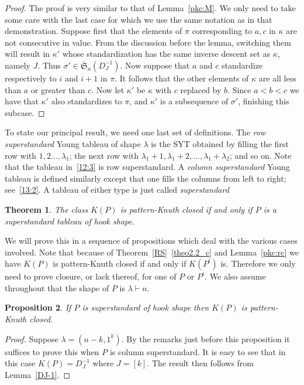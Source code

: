 \documentclass[10pt]{amsart}
\newtheorem{theo}{Theorem}[section]
\newtheorem{prop}[theo]{Proposition}
\newcommand{\ofS}{\ol{\fS}}
\newcommand{\ol}{\overline}
\newcommand{\ptn}{\vdash}
\newcommand{\ree}[1]{\eqref{#1}}
\newcommand{\ka}{\kappa}
\newcommand{\la}{\lambda}
\newcommand{\si}{\sigma}
\newcommand{\fS}{{\mathfrak S}}
\begin{document}
\begin{proof}
The proof is very similar to that of Lemma~\ref{pkc:M}. We only need to take some care with the last case for which we use the same notation as in that demonstration. Suppose first that the elements of $\pi$ corresponding to $a,c$ in $\ka$ are not consecutive in value. From the discussion before the lemma, switching them will result in $\ka'$ whose standardization has the same inverse descent set as $\ka$, namely $J$. Thus $\si'\in\ofS_n(D_J^{-1})$. Now suppose that $a$ and $c$ standardize respectively to $i$ and $i+1$ in $\pi$. It follows that the other elements of $\ka$ are all less than $a$ or greater than $c$. Now let $\ka'$ be $\ka$ with $c$ replaced by $b$. Since $a<b<c$ we have that $\ka'$ also standardizes to $\pi$, and $\ka'$ is a subsequence of $\si'$, finishing this subcase.
\end{proof}

To state our principal result, we need one last set of definitions. The \emph{row superstandard} Young tableau of shape $\la$ is the SYT obtained by filling the first row with $1,2\dots,\la_1$; the next row with $\la_1+1,\la_1+2,\dots,\la_1+\la_2$; and so on. Note that the tableau in~\ree{12:3} is row superstandard. 
A \emph{column superstandard} Young tableau is defined similarly except that one fills the columns from left to right; see~\ree{13:2}. A tableau of either type is just called \emph{superstandard}


\begin{theo}
\label{pkc:main}
The class $K(P)$ is pattern-Knuth closed if and only if $P$ is a superstandard tableau of hook shape.
\end{theo}

We will prove this in a sequence of propositions which deal with the various cases involved. Note that because of Theorem~\ref{RS}~\eqref{theo2.2_c} and Lemma~\ref{pkc:rc} we have $K(P)$ is pattern-Knuth closed if and only if $K(P^t)$ is. Therefore we only need to prove closure, or lack thereof, for one of $P$ or $P^t$. We also assume throughout that the shape of $P$ is $\lambda\ptn n$.


\begin{prop}
\label{p:hook_closed}
If $P$ is superstandard of hook shape then $K(P)$ is pattern-Knuth closed.
\end{prop}
\begin{proof}
Suppose $\la=(n-k, 1^k)$. By the remarks just before this proposition it suffices to prove this when $P$ is column superstandard. It is easy to see that in this case $K(P)=D_J^{-1}$ where $J=[k]$. The result then follows from Lemma~\ref{DJ-1}.
\end{proof}
\end{document}

